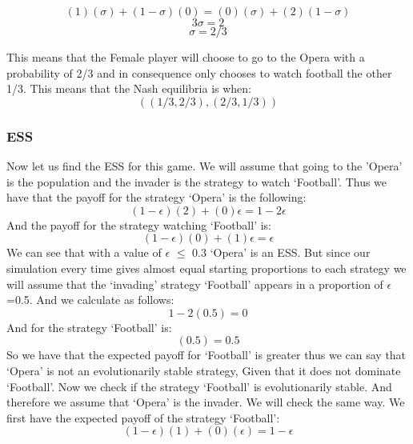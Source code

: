 \documentclass{book}
\begin{document}
\begin{equation}
(1)(\sigma) + (1 - \sigma)(0) = (0)(\sigma) + (2)(1 - \sigma)
\end{equation}
\begin{equation}
3\sigma = 2
\end{equation}
\begin{equation}
\sigma = 2/3
\end{equation}

This means that the Female player will choose to go to the Opera with a probability of 2/3 and in consequence only chooses to watch football the other 1/3. 
This means that the Nash equilibria is when:
\begin{equation}
((1/3, 2/3), (2/3, 1/3))
\end{equation}

\subsubsection{ESS}
Now let us find the ESS for this game. We will assume that going to the 'Opera' is the population and the invader is the strategy to watch `Football'. Thus we have that the payoff for the strategy `Opera' is the following:
\begin{equation}
(1-{\epsilon})(2) + (0){\epsilon} = 1 - 2{\epsilon}
\end{equation}
And the payoff for the strategy watching `Football' is:
\begin{equation}
(1-{\epsilon})(0) + (1){\epsilon} = {\epsilon}
\end{equation}
We can see that with a value of $\epsilon$ $\leq$ 0.3 `Opera' is an ESS. But since our simulation every time gives almost equal starting proportions to each strategy we will assume that the `invading' strategy `Football' appears in a proportion of $\epsilon$=0.5. And we calculate as follows:
\begin{equation}
1- 2(0.5) = 0
\end{equation}
And for the strategy `Football' is:
\begin{equation}
 (0.5) = 0.5
\end{equation}
So we have that the expected payoff for `Football' is greater thus we can say that `Opera' is not an evolutionarily stable strategy, Given that it does not dominate  `Football'.
Now we check if the strategy `Football' is evolutionarily stable. And therefore we assume that `Opera' is the invader. We will check the same way. We first have the expected payoff of the strategy `Football':
\begin{equation}
(1-{\epsilon})(1) + (0)({\epsilon}) = 1 - {\epsilon} 
\end{equation}
\end{document}
